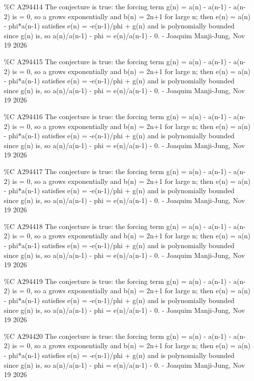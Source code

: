 {\%C A294414 The conjecture is true: the forcing term g(n) = a(n) - a(n-1) - a(n-2) is = 0, so a grows exponentially and b(n) = 2n+1 for large n; then e(n) = a(n) - phi*a(n-1) satisfies e(n) = -e(n-1)/phi + g(n) and is polynomially bounded since g(n) is, so a(n)/a(n-1) - phi = e(n)/a(n-1) - 0. - Joaquim Manji-Jung, Nov 19 2026\par
\%C A294415 The conjecture is true: the forcing term g(n) = a(n) - a(n-1) - a(n-2) is = 0, so a grows exponentially and b(n) = 2n+1 for large n; then e(n) = a(n) - phi*a(n-1) satisfies e(n) = -e(n-1)/phi + g(n) and is polynomially bounded since g(n) is, so a(n)/a(n-1) - phi = e(n)/a(n-1) - 0. - Joaquim Manji-Jung, Nov 19 2026\par
\%C A294416 The conjecture is true: the forcing term g(n) = a(n) - a(n-1) - a(n-2) is = 0, so a grows exponentially and b(n) = 2n+1 for large n; then e(n) = a(n) - phi*a(n-1) satisfies e(n) = -e(n-1)/phi + g(n) and is polynomially bounded since g(n) is, so a(n)/a(n-1) - phi = e(n)/a(n-1) - 0. - Joaquim Manji-Jung, Nov 19 2026\par
\%C A294417 The conjecture is true: the forcing term g(n) = a(n) - a(n-1) - a(n-2) is = 0, so a grows exponentially and b(n) = 2n+1 for large n; then e(n) = a(n) - phi*a(n-1) satisfies e(n) = -e(n-1)/phi + g(n) and is polynomially bounded since g(n) is, so a(n)/a(n-1) - phi = e(n)/a(n-1) - 0. - Joaquim Manji-Jung, Nov 19 2026\par
\%C A294418 The conjecture is true: the forcing term g(n) = a(n) - a(n-1) - a(n-2) is = 0, so a grows exponentially and b(n) = 2n+1 for large n; then e(n) = a(n) - phi*a(n-1) satisfies e(n) = -e(n-1)/phi + g(n) and is polynomially bounded since g(n) is, so a(n)/a(n-1) - phi = e(n)/a(n-1) - 0. - Joaquim Manji-Jung, Nov 19 2026\par
\%C A294419 The conjecture is true: the forcing term g(n) = a(n) - a(n-1) - a(n-2) is = 0, so a grows exponentially and b(n) = 2n+1 for large n; then e(n) = a(n) - phi*a(n-1) satisfies e(n) = -e(n-1)/phi + g(n) and is polynomially bounded since g(n) is, so a(n)/a(n-1) - phi = e(n)/a(n-1) - 0. - Joaquim Manji-Jung, Nov 19 2026\par
\%C A294420 The conjecture is true: the forcing term g(n) = a(n) - a(n-1) - a(n-2) is = 0, so a grows exponentially and b(n) = 2n+1 for large n; then e(n) = a(n) - phi*a(n-1) satisfies e(n) = -e(n-1)/phi + g(n) and is polynomially bounded since g(n) is, so a(n)/a(n-1) - phi = e(n)/a(n-1) - 0. - Joaquim Manji-Jung, Nov 19 2026\par
}
